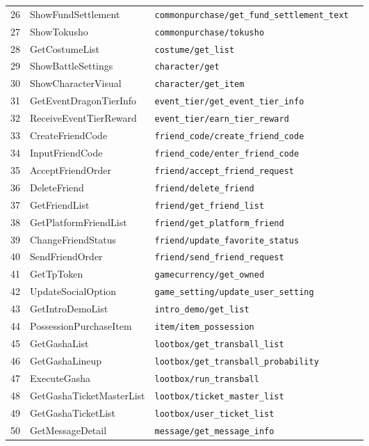 \begin{longtable}{p{} p{} p{} p{}}
26  & ShowFundSettlement & \texttt{commonpurchase/get\_fund\_settlement\_text} \\
27  & ShowTokusho & \texttt{commonpurchase/tokusho} \\
28  & GetCostumeList & \texttt{costume/get\_list} \\
29  & ShowBattleSettings & \texttt{character/get} \\
30  & ShowCharacterVisual & \texttt{character/get\_item} \\
31  & GetEventDragonTierInfo & \texttt{event\_tier/get\_event\_tier\_info} \\
32  & ReceiveEventTierReward & \texttt{event\_tier/earn\_tier\_reward} \\
33  & CreateFriendCode & \texttt{friend\_code/create\_friend\_code} \\
34  & InputFriendCode & \texttt{friend\_code/enter\_friend\_code} \\
35  & AcceptFriendOrder & \texttt{friend/accept\_friend\_request} \\
36  & DeleteFriend & \texttt{friend/delete\_friend} \\
37  & GetFriendList & \texttt{friend/get\_friend\_list} \\
38  & GetPlatformFriendList & \texttt{friend/get\_platform\_friend} \\
39  & ChangeFriendStatus & \texttt{friend/update\_favorite\_status} \\
40  & SendFriendOrder & \texttt{friend/send\_friend\_request} \\
41  & GetTpToken & \texttt{gamecurrency/get\_owned} \\
42  & UpdateSocialOption & \texttt{game\_setting/update\_user\_setting} \\
43  & GetIntroDemoList & \texttt{intro\_demo/get\_list} \\
44  & PossessionPurchaseItem & \texttt{item/item\_possession} \\
45  & GetGashaList & \texttt{lootbox/get\_transball\_list} \\
46  & GetGashaLineup & \texttt{lootbox/get\_transball\_probability} \\
47  & ExecuteGasha & \texttt{lootbox/run\_transball} \\
48  & GetGashaTicketMasterList & \texttt{lootbox/ticket\_master\_list} \\
49  & GetGashaTicketList & \texttt{lootbox/user\_ticket\_list} \\
50  & GetMessageDetail & \texttt{message/get\_message\_info} \\

\end{longtable}
